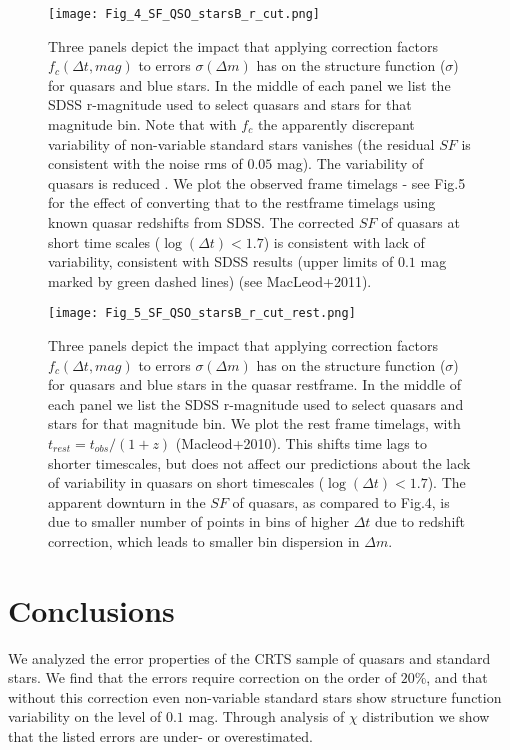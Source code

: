 \documentclass[fleqn,usenatbib]{mnras}  %
\begin{document}
\begin{figure}
\label{fig:4}
 \texttt{[image: Fig\_4\_SF\_QSO\_starsB\_r\_cut.png]}
 \caption{Three panels depict the impact that applying correction factors $f_{c}(\Delta t, mag)$ to errors $\sigma(\Delta m)$ has on the structure function ($\sigma$) for quasars and blue stars. In the middle of each panel we list the SDSS r-magnitude used to select quasars and stars for that magnitude bin. Note that with $f_{c}$ the apparently discrepant variability of non-variable standard stars  vanishes (the residual $SF$ is consistent with the noise rms of $0.05$ mag). The variability of quasars is reduced . We plot the observed frame timelags - see Fig.5 for the effect of converting that to the restframe timelags using known quasar redshifts from SDSS. The corrected $SF$ of quasars at short time scales ($\log(\Delta t) < 1.7$) is consistent with lack of variability, consistent with SDSS results (upper limits of $0.1$ mag marked by green dashed lines) (see MacLeod+2011).}
\end{figure}

\begin{figure}
\label{fig:5}
 \texttt{[image: Fig\_5\_SF\_QSO\_starsB\_r\_cut\_rest.png]}
 \caption{Three panels depict the impact that applying correction factors $f_{c}(\Delta t, mag)$ to errors $\sigma(\Delta m)$ has on the structure function ($\sigma$) for quasars and blue stars in the quasar restframe. In the middle of each panel we list the SDSS r-magnitude used to select quasars and stars for that magnitude bin. We plot the rest frame timelags, with $t_{rest} = t_{obs} / (1+z)$ (Macleod+2010). This shifts time lags to shorter timescales, but does not affect our predictions about the lack of variability in quasars on short timescales ($\log(\Delta t) < 1.7$). The apparent downturn in the $SF$ of quasars, as compared to Fig.4, is due to smaller number of points in bins of higher $\Delta t$ due to redshift correction, which leads to smaller bin dispersion in $\Delta m$. }
\end{figure}


\section{Conclusions}
We analyzed the error properties of the CRTS sample of quasars and standard stars.  We find that the errors require correction on the order of $20\%$, and that without this correction even non-variable standard stars show structure function variability on the level of $0.1$ mag. Through analysis of $\chi$ distribution we show that the listed errors are under- or overestimated.  
\end{document}
